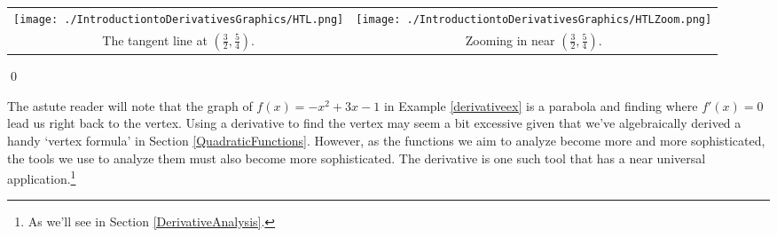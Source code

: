 \documentclass{ximera}
\begin{document}
\begin{example}
\begin{enumerate}
\begin{center}
\begin{tabular}{cc}
 \texttt{[image: ./IntroductiontoDerivativesGraphics/HTL.png]} &  \texttt{[image: ./IntroductiontoDerivativesGraphics/HTLZoom.png]}  \\
 
 The tangent line at  $\left(\frac{3}{2}, \frac{5}{4} \right)$. & Zooming in near $\left(\frac{3}{2}, \frac{5}{4} \right)$.  \\
 
 \end{tabular}
 
 \end{center}
 
 \hfill \qed


\end{enumerate}

\end{example}

The astute reader will note that the graph of $f(x) = -x^2+3x-1$ in Example \ref{derivativeex} is a parabola and finding where $f'(x) = 0$ lead us right back to the vertex.  Using a derivative to find the vertex may seem a bit excessive given that we've algebraically derived a handy `vertex formula' in Section \ref{QuadraticFunctions}.   However, as the functions we aim to analyze become more and more sophisticated, the tools we use to analyze them must also become more sophisticated.  The derivative is one such tool that has a near universal application.\footnote{As we'll see in Section \ref{DerivativeAnalysis}.}

\medskip
\end{document}
